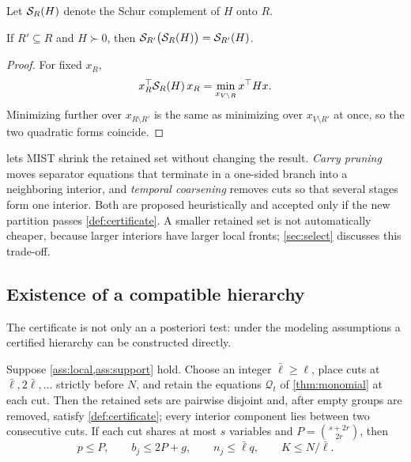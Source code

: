 Let $\mathcal S_R(H)$ denote the Schur complement of $H$ onto $R$.

\begin{proposition}\label{prop:assoc}
If $R'\subseteq R$ and $H\succ0$, then $\mathcal S_{R'}\bigl(\mathcal S_R(H)\bigr)=\mathcal S_{R'}(H)$.
\end{proposition}

\begin{proof}
For fixed $x_R$,
\begin{equation}\label{eq:minform}
x_R^\top\mathcal S_R(H)\,x_R=\min_{x_{V\setminus R}}x^\top Hx.
\end{equation}
Minimizing further over $x_{R\setminus R'}$ is the same as minimizing over
$x_{V\setminus R'}$ at once, so the two quadratic forms coincide.
\end{proof}

 lets MIST shrink the retained set without changing the result.
\emph{Carry pruning} moves separator equations that terminate in a one-sided branch
into a neighboring interior, and \emph{temporal coarsening} removes cuts so that
several stages form one interior. Both are proposed heuristically and accepted only
if the new partition passes \cref{def:certificate}. A smaller retained set is not
automatically cheaper, because larger interiors have larger local fronts;
\cref{sec:select} discusses this trade-off.

\subsection{Existence of a compatible hierarchy}

The certificate is not only an a posteriori test: under the modeling assumptions a
certified hierarchy can be constructed directly.

\begin{theorem}\label{thm:spaced}
Suppose \cref{ass:local,ass:support} hold. Choose an integer $\bar\ell\ge\ell$,
place cuts at $\bar\ell,2\bar\ell,\ldots$ strictly before $N$, and retain the
equations $\mathcal Q_t$ of \cref{thm:monomial} at each cut. Then the retained sets
are pairwise disjoint and, after empty groups are removed, satisfy
\cref{def:certificate}; every interior component lies between two consecutive
cuts. If each cut shares at most $s$ variables and $P=\binom{s+2r}{2r}$, then
\begin{equation}\label{eq:spaced}
p\le P,\qquad b_j\le2P+g,\qquad n_j\le\bar\ell q,\qquad K\le N/\bar\ell.
\end{equation}
\end{theorem}

